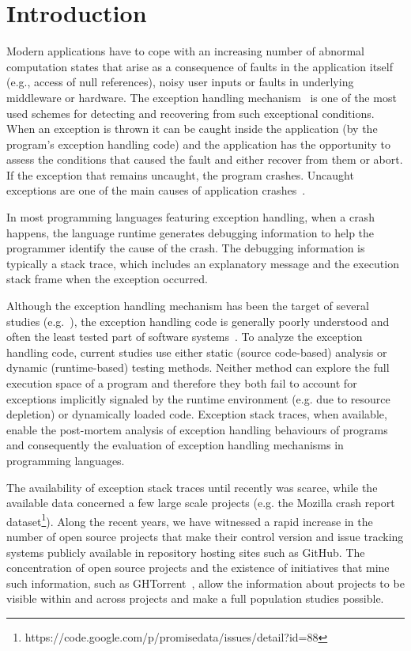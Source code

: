 \documentclass[conference]{IEEEtran}
\begin{document}
\section{Introduction}


Modern applications have to cope with an increasing number of abnormal
computation states that arise as a consequence of faults in the application
itself (e.g., access of null references), noisy user inputs or faults in
underlying middleware or hardware. The exception handling
mechanism~\cite{goodenough1975exception} is one of the most used schemes for
detecting and recovering from such exceptional conditions. When an exception is
thrown it can be caught inside the application (by the program's exception
handling code) and the application has the opportunity to assess the conditions
that caused the fault and either recover from them or abort. If the exception
that remains uncaught, the program crashes. Uncaught exceptions are one of the
main causes of application crashes~\cite{jo2004uncaught}.

In most programming languages featuring exception handling, when a crash
happens, the language runtime generates debugging information to help the
programmer identify the cause of the crash. The debugging information is
typically a stack trace, which includes an explanatory message and the execution
stack frame when the exception occurred.

Although the exception handling mechanism has been the target of several studies
(e.g.~\cite{miller1997issues,Robil00,shah2010understanding,
garcia2007extracting,garcia2001comparative,cabral2007exception,coelho2011unveiling}),
the exception handling code is generally poorly understood and often the least
tested part of software systems~\cite{coelho2011unveiling}.  To analyze the
exception handling code, current studies use either static (source code-based)
analysis or dynamic (runtime-based) testing methods. Neither method can explore
the full execution space of a program and therefore they both fail to account
for exceptions implicitly signaled by the runtime environment (e.g. due to
resource depletion) or dynamically loaded code. Exception stack traces, when
available, enable the post-mortem analysis of exception handling behaviours of
programs and consequently the evaluation of exception handling mechanisms in
programming languages.

The availability of exception stack traces until recently was scarce, while the
available data concerned a few large scale projects (e.g. the Mozilla
crash report
dataset\footnote{https://code.google.com/p/promisedata/issues/detail?id=88}).
Along the recent years, we have witnessed a rapid increase in the number of open
source projects that make their control version and issue tracking systems
publicly available in repository hosting sites such as GitHub. The
concentration of open source projects and the existence of initiatives that mine
such information, such as GHTorrent~\cite{Gousi13}, allow the information about
projects to be visible within and across projects and make a full population
studies possible.
\end{document}
